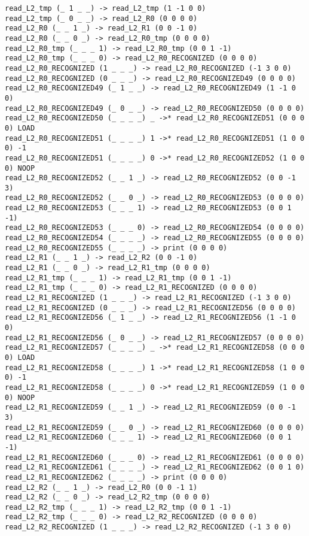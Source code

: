 \documentclass[english,shortabstract,mgr]{iithesis}
\begin{document}
\begin{verbatim}
read_L2_tmp (_ 1 _ _) -> read_L2_tmp (1 -1 0 0)
read_L2_tmp (_ 0 _ _) -> read_L2_R0 (0 0 0 0)
read_L2_R0 (_ _ 1 _) -> read_L2_R1 (0 0 -1 0)
read_L2_R0 (_ _ 0 _) -> read_L2_R0_tmp (0 0 0 0)
read_L2_R0_tmp (_ _ _ 1) -> read_L2_R0_tmp (0 0 1 -1)
read_L2_R0_tmp (_ _ _ 0) -> read_L2_R0_RECOGNIZED (0 0 0 0)
read_L2_R0_RECOGNIZED (1 _ _ _) -> read_L2_R0_RECOGNIZED (-1 3 0 0)
read_L2_R0_RECOGNIZED (0 _ _ _) -> read_L2_R0_RECOGNIZED49 (0 0 0 0)
read_L2_R0_RECOGNIZED49 (_ 1 _ _) -> read_L2_R0_RECOGNIZED49 (1 -1 0 0)
read_L2_R0_RECOGNIZED49 (_ 0 _ _) -> read_L2_R0_RECOGNIZED50 (0 0 0 0)
read_L2_R0_RECOGNIZED50 (_ _ _ _) _ ->* read_L2_R0_RECOGNIZED51 (0 0 0 0) LOAD
read_L2_R0_RECOGNIZED51 (_ _ _ _) 1 ->* read_L2_R0_RECOGNIZED51 (1 0 0 0) -1
read_L2_R0_RECOGNIZED51 (_ _ _ _) 0 ->* read_L2_R0_RECOGNIZED52 (1 0 0 0) NOOP
read_L2_R0_RECOGNIZED52 (_ _ 1 _) -> read_L2_R0_RECOGNIZED52 (0 0 -1 3)
read_L2_R0_RECOGNIZED52 (_ _ 0 _) -> read_L2_R0_RECOGNIZED53 (0 0 0 0)
read_L2_R0_RECOGNIZED53 (_ _ _ 1) -> read_L2_R0_RECOGNIZED53 (0 0 1 -1)
read_L2_R0_RECOGNIZED53 (_ _ _ 0) -> read_L2_R0_RECOGNIZED54 (0 0 0 0)
read_L2_R0_RECOGNIZED54 (_ _ _ _) -> read_L2_R0_RECOGNIZED55 (0 0 0 0)
read_L2_R0_RECOGNIZED55 (_ _ _ _) -> print (0 0 0 0)
read_L2_R1 (_ _ 1 _) -> read_L2_R2 (0 0 -1 0)
read_L2_R1 (_ _ 0 _) -> read_L2_R1_tmp (0 0 0 0)
read_L2_R1_tmp (_ _ _ 1) -> read_L2_R1_tmp (0 0 1 -1)
read_L2_R1_tmp (_ _ _ 0) -> read_L2_R1_RECOGNIZED (0 0 0 0)
read_L2_R1_RECOGNIZED (1 _ _ _) -> read_L2_R1_RECOGNIZED (-1 3 0 0)
read_L2_R1_RECOGNIZED (0 _ _ _) -> read_L2_R1_RECOGNIZED56 (0 0 0 0)
read_L2_R1_RECOGNIZED56 (_ 1 _ _) -> read_L2_R1_RECOGNIZED56 (1 -1 0 0)
read_L2_R1_RECOGNIZED56 (_ 0 _ _) -> read_L2_R1_RECOGNIZED57 (0 0 0 0)
read_L2_R1_RECOGNIZED57 (_ _ _ _) _ ->* read_L2_R1_RECOGNIZED58 (0 0 0 0) LOAD
read_L2_R1_RECOGNIZED58 (_ _ _ _) 1 ->* read_L2_R1_RECOGNIZED58 (1 0 0 0) -1
read_L2_R1_RECOGNIZED58 (_ _ _ _) 0 ->* read_L2_R1_RECOGNIZED59 (1 0 0 0) NOOP
read_L2_R1_RECOGNIZED59 (_ _ 1 _) -> read_L2_R1_RECOGNIZED59 (0 0 -1 3)
read_L2_R1_RECOGNIZED59 (_ _ 0 _) -> read_L2_R1_RECOGNIZED60 (0 0 0 0)
read_L2_R1_RECOGNIZED60 (_ _ _ 1) -> read_L2_R1_RECOGNIZED60 (0 0 1 -1)
read_L2_R1_RECOGNIZED60 (_ _ _ 0) -> read_L2_R1_RECOGNIZED61 (0 0 0 0)
read_L2_R1_RECOGNIZED61 (_ _ _ _) -> read_L2_R1_RECOGNIZED62 (0 0 1 0)
read_L2_R1_RECOGNIZED62 (_ _ _ _) -> print (0 0 0 0)
read_L2_R2 (_ _ 1 _) -> read_L2_R0 (0 0 -1 1)
read_L2_R2 (_ _ 0 _) -> read_L2_R2_tmp (0 0 0 0)
read_L2_R2_tmp (_ _ _ 1) -> read_L2_R2_tmp (0 0 1 -1)
read_L2_R2_tmp (_ _ _ 0) -> read_L2_R2_RECOGNIZED (0 0 0 0)
read_L2_R2_RECOGNIZED (1 _ _ _) -> read_L2_R2_RECOGNIZED (-1 3 0 0)

\end{verbatim}
\end{document}
